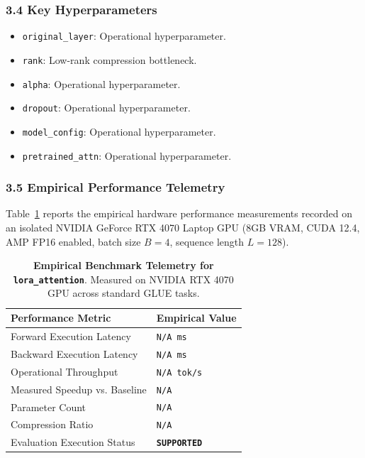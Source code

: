\subsubsection*{3.4 Key Hyperparameters}
\begin{itemize}
    \item \texttt{original\_layer}: Operational hyperparameter.
    \item \texttt{rank}: Low-rank compression bottleneck.
    \item \texttt{alpha}: Operational hyperparameter.
    \item \texttt{dropout}: Operational hyperparameter.
    \item \texttt{model\_config}: Operational hyperparameter.
    \item \texttt{pretrained\_attn}: Operational hyperparameter.
\end{itemize}

\subsubsection*{3.5 Empirical Performance Telemetry}
Table~\ref{tab:telemetry_lora\_attention} reports the empirical hardware performance measurements recorded on an isolated NVIDIA GeForce RTX 4070 Laptop GPU (8GB VRAM, CUDA 12.4, AMP FP16 enabled, batch size $B=4$, sequence length $L=128$).

\begin{table}[h]
\centering
\small
\caption{\textbf{Empirical Benchmark Telemetry for \texttt{lora\_attention}}. Measured on NVIDIA RTX 4070 GPU across standard GLUE tasks.}
\label{tab:telemetry_lora\_attention}
\begin{tabularx}{\columnwidth}{lX}
\toprule
\textbf{Performance Metric} & \textbf{Empirical Value} \\
\midrule
Forward Execution Latency & \texttt{N/A ms} \\
Backward Execution Latency & \texttt{N/A ms} \\
Operational Throughput & \texttt{N/A tok/s} \\
Measured Speedup vs. Baseline & \texttt{N/A} \\
Parameter Count & \texttt{N/A} \\
Compression Ratio & \texttt{N/A} \\
Evaluation Execution Status & \textbf{\texttt{SUPPORTED}} \\
\bottomrule
\end{tabularx}
\end{table}

